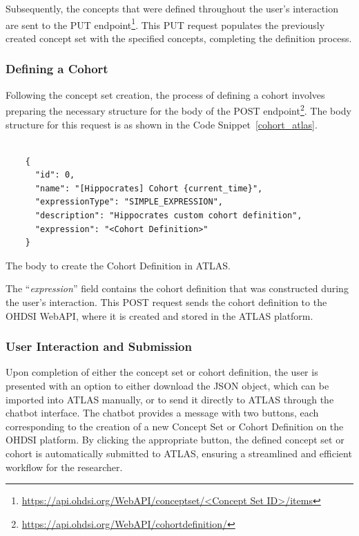 Subsequently, the concepts that were defined throughout the user's interaction are sent to the PUT endpoint\footnote{\url{https://api.ohdsi.org/WebAPI/conceptset/<Concept Set ID>/items}}. This PUT request populates the previously created concept set with the specified concepts, completing the definition process.

\subsubsection{Defining a Cohort}

Following the concept set creation, the process of defining a cohort involves preparing the necessary structure for the body of the POST endpoint\footnote{\url{https://api.ohdsi.org/WebAPI/cohortdefinition/}}. The body structure for this request is as shown in the Code Snippet~\ref{cohort_atlas}.


\begin{listing}[H]
  \begin{verbatim}
      
    {
      "id": 0,
      "name": "[Hippocrates] Cohort {current_time}",
      "expressionType": "SIMPLE_EXPRESSION",
      "description": "Hippocrates custom cohort definition",
      "expression": "<Cohort Definition>"
    }

  \end{verbatim}
  \caption[The body to create the Cohort Definition in ATLAS]{The body to create the Cohort Definition in ATLAS.}
  \label{cohort_atlas}
\end{listing}


The ``\textit{expression}'' field contains the cohort definition that was constructed during the user's interaction. This POST request sends the cohort definition to the OHDSI WebAPI, where it is created and stored in the ATLAS platform.

\subsubsection{User Interaction and Submission}

Upon completion of either the concept set or cohort definition, the user is presented with an option to either download the JSON object, which can be imported into ATLAS manually, or to send it directly to ATLAS through the chatbot interface. The chatbot provides a message with two buttons, each corresponding to the creation of a new Concept Set or Cohort Definition on the OHDSI platform. By clicking the appropriate button, the defined concept set or cohort is automatically submitted to ATLAS, ensuring a streamlined and efficient workflow for the researcher.




